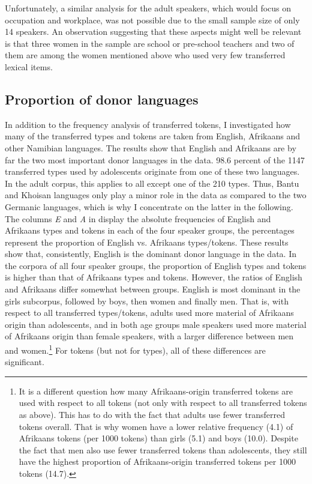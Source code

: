 \documentclass[output=paper]{langsci/langscibook}
\begin{document}
Unfortunately, a similar analysis for the adult speakers, which would focus on occupation and workplace, was not possible due to the small sample size of only 14 speakers. An observation suggesting that these aspects might well be relevant is that three women in the sample are school or pre-school teachers and two of them are among the women mentioned above who used very few transferred lexical items.

 
   
\subsection{Proportion of donor languages}
\label{sec:bracke:5.2}

In addition to the frequency analysis of transferred tokens, I investigated how many of the transferred types and tokens are taken from English, Afrikaans and other Namibian languages. The results show that English and Afrikaans are by far the two most important donor languages in the data. 98.6 percent of the 1147 transferred types used by adolescents originate from one of these two languages. In the adult corpus, this applies to all except one of the 210 types. Thus, Bantu and Khoisan languages only play a minor role in the data as compared to the two Germanic languages, which is why I concentrate on the latter in the following. The columns \textit{E} and \textit{A} in  display the absolute frequencies of English and Afrikaans types and tokens in each of the four speaker groups, the percentages represent the proportion of English vs. Afrikaans types/tokens. These results show that, consistently, English is the dominant donor language in the data. In the corpora of all four speaker groups, the proportion of English types and tokens is higher than that of Afrikaans types and tokens. However, the ratios of English and Afrikaans differ somewhat between groups. English is most dominant in the girls subcorpus, followed by boys, then women and finally men. That is, with respect to all transferred types/tokens, adults used more material of Afrikaans origin than adolescents, and in both age groups male speakers used more material of Afrikaans origin than female speakers, with a larger difference between men and women.\footnote{It is a different question how many Afrikaans-origin transferred tokens are used with respect to all tokens (not only with respect to all transferred tokens as above). This has to do with the fact that adults use fewer transferred tokens overall. That is why women have a lower relative frequency (4.1) of Afrikaans tokens (per 1000 tokens) than girls (5.1) and boys (10.0). Despite the fact that men also use fewer transferred tokens than adolescents, they still have the highest proportion of Afrikaans-origin transferred tokens per 1000 tokens (14.7).} For tokens (but not for types), all of these differences are significant.
\end{document}
